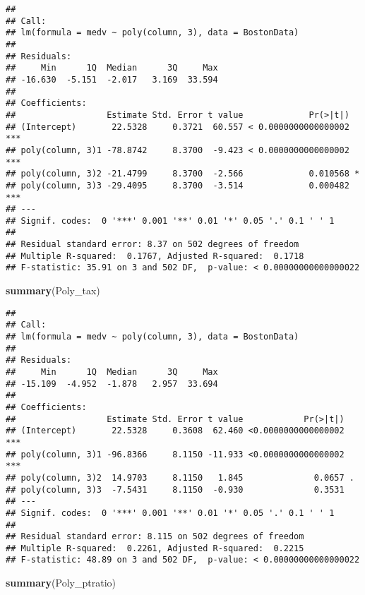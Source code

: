 \documentclass[]{article}
\newenvironment{Shaded}{\begin{snugshade}}{\end{snugshade}}
\newcommand{\KeywordTok}[1]{\textcolor[rgb]{0.13,0.29,0.53}{\textbf{#1}}}
\newcommand{\NormalTok}[1]{#1}
\begin{document}
\begin{verbatim}
## 
## Call:
## lm(formula = medv ~ poly(column, 3), data = BostonData)
## 
## Residuals:
##     Min      1Q  Median      3Q     Max 
## -16.630  -5.151  -2.017   3.169  33.594 
## 
## Coefficients:
##                  Estimate Std. Error t value             Pr(>|t|)    
## (Intercept)       22.5328     0.3721  60.557 < 0.0000000000000002 ***
## poly(column, 3)1 -78.8742     8.3700  -9.423 < 0.0000000000000002 ***
## poly(column, 3)2 -21.4799     8.3700  -2.566             0.010568 *  
## poly(column, 3)3 -29.4095     8.3700  -3.514             0.000482 ***
## ---
## Signif. codes:  0 '***' 0.001 '**' 0.01 '*' 0.05 '.' 0.1 ' ' 1
## 
## Residual standard error: 8.37 on 502 degrees of freedom
## Multiple R-squared:  0.1767, Adjusted R-squared:  0.1718 
## F-statistic: 35.91 on 3 and 502 DF,  p-value: < 0.00000000000000022
\end{verbatim}

\begin{Shaded}
\begin{Highlighting}[]
\KeywordTok{summary}\NormalTok{(Poly_tax)}
\end{Highlighting}
\end{Shaded}

\begin{verbatim}
## 
## Call:
## lm(formula = medv ~ poly(column, 3), data = BostonData)
## 
## Residuals:
##     Min      1Q  Median      3Q     Max 
## -15.109  -4.952  -1.878   2.957  33.694 
## 
## Coefficients:
##                  Estimate Std. Error t value            Pr(>|t|)    
## (Intercept)       22.5328     0.3608  62.460 <0.0000000000000002 ***
## poly(column, 3)1 -96.8366     8.1150 -11.933 <0.0000000000000002 ***
## poly(column, 3)2  14.9703     8.1150   1.845              0.0657 .  
## poly(column, 3)3  -7.5431     8.1150  -0.930              0.3531    
## ---
## Signif. codes:  0 '***' 0.001 '**' 0.01 '*' 0.05 '.' 0.1 ' ' 1
## 
## Residual standard error: 8.115 on 502 degrees of freedom
## Multiple R-squared:  0.2261, Adjusted R-squared:  0.2215 
## F-statistic: 48.89 on 3 and 502 DF,  p-value: < 0.00000000000000022
\end{verbatim}

\begin{Shaded}
\begin{Highlighting}[]
\KeywordTok{summary}\NormalTok{(Poly_ptratio)}
\end{Highlighting}
\end{Shaded}
\end{document}
